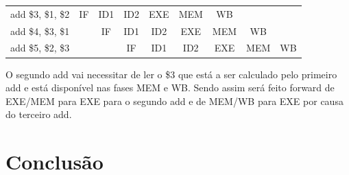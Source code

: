 \documentclass[pdftex,12pt,a4paper]{report}
\begin{document}
\begin{table}[!htb]
\centering
\label{my-label}
\begin{tabular}{lcc|c|c|c|c|cc}
\cline{2-7}
\multicolumn{1}{l|}{add \$3, \$1, \$2} & \multicolumn{1}{c|}{IF} & ID1 & ID2 & \cellcolor[HTML]{F8A102}EXE & \cellcolor[HTML]{FFCC67}MEM & \cellcolor[HTML]{FFCC67}WB  &                          &                         \\ \cline{2-8}
add \$4, \$3, \$1                      & \multicolumn{1}{c|}{}   & IF  & ID1 & ID2                         & \cellcolor[HTML]{F8A102}EXE & MEM                         & \multicolumn{1}{c|}{WB}  &                         \\ \cline{3-9} 
add \$5, \$2, \$3                      &                         &     & IF  & ID1                         & ID2                         & \cellcolor[HTML]{F8A102}EXE & \multicolumn{1}{c|}{MEM} & \multicolumn{1}{c|}{WB} \\ \cline{4-9} 
\end{tabular}
\end{table}

O segundo add vai necessitar de ler o \$3 que está a ser calculado  pelo primeiro add e está disponível nas fases MEM e WB. Sendo assim será feito forward de EXE/MEM para EXE para o segundo add e de MEM/WB para EXE por causa do terceiro add.


\newpage
\section{Conclusão}
\end{document}
